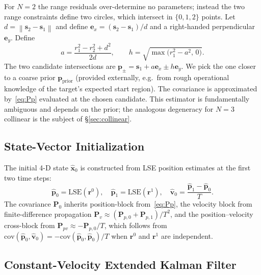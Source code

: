 \documentclass[11pt,a4paper]{article}
\newcommand{\norm}[1]{\left\lVert #1 \right\rVert}
\begin{document}
For $N = 2$ the range residuals over-determine no parameters; instead the
two range constraints define two circles, which intersect in $\{0,1,2\}$
points.  Let $d = \norm{\mathbf{s}_2 - \mathbf{s}_1}$ and define
$\mathbf{e}_x = (\mathbf{s}_2 - \mathbf{s}_1)/d$ and a
right-handed perpendicular $\mathbf{e}_y$.  Define
\begin{equation}
  a = \frac{r_1^2 - r_2^2 + d^2}{2d},
  \qquad
  h = \sqrt{\max\!\bigl(r_1^2 - a^2,\, 0\bigr)}.
\end{equation}
The two candidate intersections are
$\mathbf{p}_\pm = \mathbf{s}_1 + a\mathbf{e}_x \pm h\mathbf{e}_y$.
We pick the one closer to a coarse prior $\mathbf{p}_{\text{prior}}$
(provided externally, e.g.\ from rough operational knowledge of the target's
expected start region).  The covariance is approximated by~\eqref{eq:Pp}
evaluated at the chosen candidate.  This estimator is fundamentally
ambiguous and depends on the prior; the analogous degeneracy for $N{=}3$
collinear is the subject of \S\ref{sec:collinear}.

\subsection{State-Vector Initialization}

The initial 4-D state $\hat{\mathbf{x}}_0$ is constructed from LSE position
estimates at the first two time steps:
\begin{equation}
  \hat{\mathbf{p}}_0 = \mathrm{LSE}(\mathbf{r}^0),
  \quad
  \hat{\mathbf{p}}_1 = \mathrm{LSE}(\mathbf{r}^1),
  \quad
  \hat{\mathbf{v}}_0 = \frac{\hat{\mathbf{p}}_1 - \hat{\mathbf{p}}_0}{T}.
\end{equation}
The covariance $\mathbf{P}_0$ inherits position-block from~\eqref{eq:Pp},
the velocity block from finite-difference propagation
$\mathbf{P}_v \approx (\mathbf{P}_{p,0} + \mathbf{P}_{p,1})/T^2$, and the
position--velocity cross-block from
$\mathbf{P}_{pv} \approx -\mathbf{P}_{p,0}/T$, which follows from
$\mathrm{cov}(\hat{\mathbf{p}}_0, \hat{\mathbf{v}}_0) =
-\mathrm{cov}(\hat{\mathbf{p}}_0,\hat{\mathbf{p}}_0)/T$ when $\mathbf{r}^0$
and $\mathbf{r}^1$ are independent.

\subsection{Constant-Velocity Extended Kalman Filter}
\label{subsec:ekf}
\end{document}

